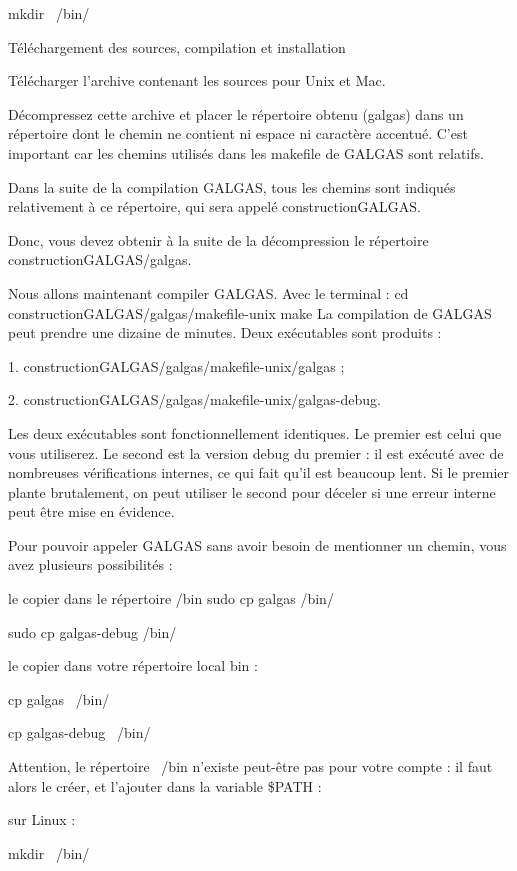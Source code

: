 mkdir ~/bin/


Téléchargement des sources, compilation et installation

Télécharger l’archive contenant les sources pour Unix et Mac.

Décompressez cette archive et placer le répertoire obtenu (galgas) dans un répertoire dont le chemin ne contient ni espace ni caractère accentué. C'est important car les chemins utilisés dans les makefile de GALGAS sont relatifs.

Dans la suite de la compilation GALGAS, tous les chemins sont indiqués relativement à ce répertoire, qui sera appelé constructionGALGAS.

Donc, vous devez obtenir à la suite de la décompression le répertoire constructionGALGAS/galgas.

Nous allons maintenant compiler GALGAS. Avec le terminal :
	cd constructionGALGAS/galgas/makefile-unix
	make
La compilation de GALGAS peut prendre une dizaine de minutes. Deux exécutables sont produits :

1.	constructionGALGAS/galgas/makefile-unix/galgas ;

2.	constructionGALGAS/galgas/makefile-unix/galgas-debug.

Les deux exécutables sont fonctionnellement identiques. Le premier est celui que vous utiliserez. Le second est la version debug du premier : il est exécuté avec de nombreuses vérifications internes, ce qui fait qu’il est beaucoup lent. Si le premier plante brutalement, on peut utiliser le second pour déceler si une erreur interne peut être mise en évidence.

Pour pouvoir appeler GALGAS sans avoir besoin de mentionner un chemin, vous avez plusieurs possibilités :

le copier dans le répertoire /bin
sudo cp galgas /bin/

sudo cp galgas-debug /bin/

le copier dans votre répertoire local bin :

cp galgas ~/bin/

cp galgas-debug ~/bin/

Attention, le répertoire ~/bin n'existe peut-être pas pour votre compte : il faut alors le créer, et l'ajouter dans la variable \$PATH :

sur Linux :

mkdir ~/bin/


